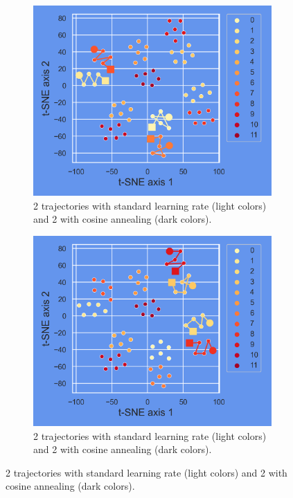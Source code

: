 \begin{figure}[H]
	\centering
	\begin{subfigure}{.45\textwidth}
		\centering
		\includegraphics[width=.9\linewidth]{./figs/params_tSNE_0.png}  
		\caption{2 trajectories with standard learning rate (light colors) and 2 with cosine annealing (dark colors).}
		\label{fig:sub-first}
	\end{subfigure}
	\begin{subfigure}{.45\textwidth}
		\centering
		\includegraphics[width=.9\linewidth]{./figs/params_tSNE_1.png}  
		\caption{2 trajectories with standard learning rate (light colors) and 2 with cosine annealing (dark colors).}
		\label{fig:sub-second}
	\end{subfigure}

\end{figure}
